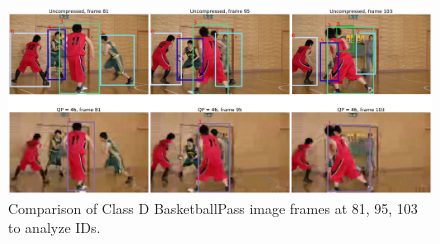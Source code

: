 \begin{figure}[!htbp]
  \centering
  \includegraphics[width=1.0\linewidth]{img/BasketballPass_0_IDs.pdf}
  \caption[Comparison of Class D BasketballPass image frames at 81, 95, 103 to analyze IDs]
  {
  Comparison of Class D BasketballPass image frames at 81, 95, 103 to analyze IDs.
  }
  \label{fig:BasketballPass_0_IDs}
\end{figure}